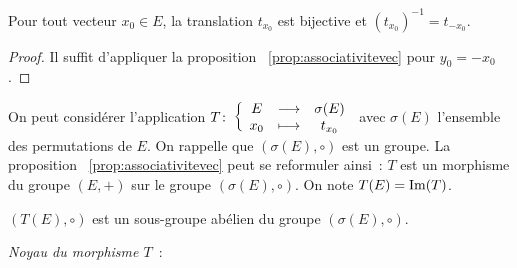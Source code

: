 \begin{prop}
  Pour tout vecteur \(x_0 \in E\), la translation \(t_{x_0}\) est bijective et \((t_{x_0})^{-1}=t_{-x_0}\).
\end{prop}
\begin{proof}
  Il suffit d'appliquer la proposition~
  \ref{prop:associativitevec} pour \(y_0=-x_0\).
\end{proof}

On peut considérer l'application \(T\colon \left\{\begin{array}{ccc} E & \longrightarrow &\sigma(E)\\ x_0 & \longmapsto & t_{x_0} \end{array} \right.\) avec \(\sigma(E)\) l'ensemble des permutations de \(E\). On rappelle que \((\sigma(E),\circ)\) est un groupe. La proposition~
\ref{prop:associativitevec} peut se reformuler ainsi~: \(T\) est un morphisme du groupe \((E,+)\) sur le groupe \((\sigma(E),\circ)\). On note \(T(E)=\operatorname{Im}(T)\).

\begin{prop}
  \((T(E),\circ)\) est un sous-groupe abélien du groupe \((\sigma(E),\circ)\).
\end{prop}

\emph{Noyau du morphisme \(T\)}~:

